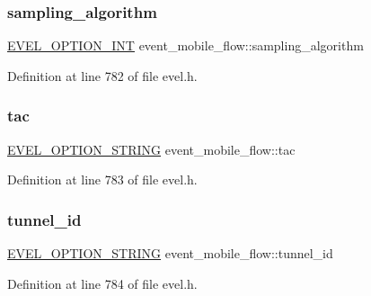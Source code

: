 \subsubsection{\texorpdfstring{sampling\+\_\+algorithm}{sampling\_algorithm}}
{\footnotesize\ttfamily \hyperlink{evel_8h_a452d825778d1c2368a54b8f689a25ba7}{E\+V\+E\+L\+\_\+\+O\+P\+T\+I\+O\+N\+\_\+\+I\+NT} event\+\_\+mobile\+\_\+flow\+::sampling\+\_\+algorithm}



Definition at line 782 of file evel.\+h.

\hypertarget{structevent__mobile__flow_a7345060c916d0cf3885a1cf4654e816b}{}\label{structevent__mobile__flow_a7345060c916d0cf3885a1cf4654e816b} 
\subsubsection{\texorpdfstring{tac}{tac}}
{\footnotesize\ttfamily \hyperlink{evel_8h_a0de5113a7b72de93c0c7b644f7ea7ec3}{E\+V\+E\+L\+\_\+\+O\+P\+T\+I\+O\+N\+\_\+\+S\+T\+R\+I\+NG} event\+\_\+mobile\+\_\+flow\+::tac}



Definition at line 783 of file evel.\+h.

\hypertarget{structevent__mobile__flow_adcab62a3ae56b62f949227004a0e75fc}{}\label{structevent__mobile__flow_adcab62a3ae56b62f949227004a0e75fc} 
\subsubsection{\texorpdfstring{tunnel\+\_\+id}{tunnel\_id}}
{\footnotesize\ttfamily \hyperlink{evel_8h_a0de5113a7b72de93c0c7b644f7ea7ec3}{E\+V\+E\+L\+\_\+\+O\+P\+T\+I\+O\+N\+\_\+\+S\+T\+R\+I\+NG} event\+\_\+mobile\+\_\+flow\+::tunnel\+\_\+id}



Definition at line 784 of file evel.\+h.

\hypertarget{structevent__mobile__flow_ade92900e6abdc8c2f1a72db525110e92}{}\label{structevent__mobile__flow_ade92900e6abdc8c2f1a72db525110e92} 
